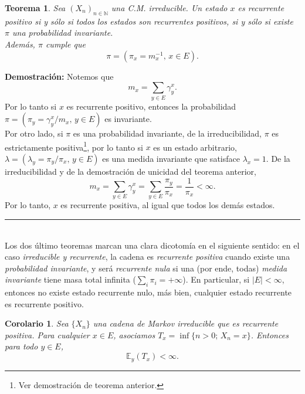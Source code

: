 \documentclass[a4paper]{article}
\newtheorem{teorema}{Teorema}
\newtheorem{cor}{Corolario}
\numberwithin{equation}{subsection}
\numberwithin{definicion}{subsection}
\def\N{\mathbb N}
\def\E{\mathbb E}
\begin{document}
\begin{teorema}
Sea $(X_n)_{n\in \N}$ una C.M. irreducible. Un estado $x$ es recurrente positivo si y sólo si todos los estados son recurrentes positivos, si y sólo si existe $\pi$ una probabilidad invariante.\\ \newline
Además, $\pi$ cumple que
\[\pi = (\pi_x = m_x^{-1},\,x\in E).\]
\end{teorema}

\textbf{Demostración: }Notemos que
\[m_x = \sum_{y\in E}\gamma_y^x.\]
Por lo tanto si $x$ es recurrente positivo, entonces la probabilidad $\pi = (\pi_y = \gamma_y^x/m_x,\,y\in E)$ es invariante.\\ 

Por otro lado, si $\pi$ es una probabilidad invariante, de la irreducibilidad, $\pi$ es estrictamente positiva\footnote{Ver demostración de teorema anterior.}, por lo tanto si $x$ es un estado arbitrario, $\lambda = (\lambda_y = \pi_y / \pi_x,\, y \in E)$ es una medida invariante que satisface $\lambda_x =1$. De la irreducibilidad y de la demostración de unicidad del teorema anterior,
\[m_x = \sum_{y\in E}\gamma_y^x = \sum_{y\in E}\frac{\pi_y}{\pi_x} = \frac{1}{\pi_x} <\infty.\]
Por lo tanto, $x$ es recurrente positiva, al igual que todos los demás estados.\\
\rule{0.7em}{0.7em}\\ \newline
Los dos último teoremas marcan una clara dicotomía en el siguiente sentido: en el caso \textit{irreducible y recurrente}, la cadena es \textit{recurrente positiva} cuando existe una \textit{probabilidad invariante}, y será \textit{recurrente nula} si una (por ende, todas) \textit{medida invariante} tiene masa total infinita ($\sum_i \pi_i = +\infty$). En particular, si $|E|<\infty$, entonces no existe estado recurrente nulo, más bien, cualquier estado recurrente es recurrente positivo.

\begin{cor}
Sea $\{X_n\}$ una cadena de Markov irreducible que es recurrente positiva. Para cualquier $x \in E$, asociamos $T_x =\inf\{n>0;\,X_n=x\}$. Entonces para todo $y\in E$,
\[\E_y(T_x) < \infty.\]
\end{cor}
\end{document}
